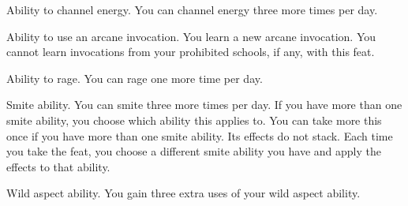 \featpre Ability to channel energy.
\featben You can channel energy three more times per day.

\featpre Ability to use an arcane invocation.
\featben You learn a new arcane invocation.
You cannot learn invocations from your prohibited schools, if any, with this feat.

\featpre Ability to rage.
\featben You can rage one more time per day.

\featpre Smite ability.
\featben You can smite three more times per day.
If you have more than one smite ability, you choose which ability this applies to.
You can take more this once if you have more than one smite ability.
Its effects do not stack.
Each time you take the feat, you choose a different smite ability you have and apply the effects to that ability.

\featpre Wild aspect ability.
\featben You gain three extra uses of your wild aspect ability.

